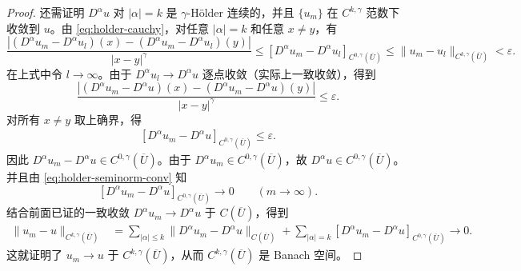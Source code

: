 \documentclass[../../main.tex]{subfiles}
\begin{document}
\begin{proof}
还需证明 \(D^\alpha u\) 对 \(|\alpha|=k\) 是 \(\gamma\)-Hölder 连续的，并且 \(\{u_m\}\) 在 \(C^{k,\gamma}\) 范数下收敛到 \(u\)。由 \eqref{eq:holder-cauchy}，对任意 \(|\alpha|=k\) 和任意 \(x\neq y\)，有
\[
\frac{|(D^\alpha u_m-D^\alpha u_l)(x)-(D^\alpha u_m-D^\alpha u_l)(y)|}{|x-y|^\gamma}
\leqslant [D^\alpha u_m-D^\alpha u_l]_{C^{0,\gamma}(\overline{U})}
\leqslant \|u_m-u_l\|_{C^{k,\gamma}(\overline{U})}<\varepsilon.
\]
在上式中令 \(l\to\infty\)。由于 \(D^\alpha u_l\to D^\alpha u\) 逐点收敛（实际上一致收敛），得到
\[
\frac{|(D^\alpha u_m-D^\alpha u)(x)-(D^\alpha u_m-D^\alpha u)(y)|}{|x-y|^\gamma}
\leqslant \varepsilon.
\]
对所有 \(x\neq y\) 取上确界，得
\begin{align}\label{eq:holder-seminorm-conv}
[D^\alpha u_m-D^\alpha u]_{C^{0,\gamma}(\overline{U})}\leqslant \varepsilon.
\end{align}
因此 \(D^\alpha u_m-D^\alpha u\in C^{0,\gamma}(\overline{U})\)。由于 \(D^\alpha u_m\in C^{0,\gamma}(\overline{U})\)，故 \(D^\alpha u\in C^{0,\gamma}(\overline{U})\)。并且由 \eqref{eq:holder-seminorm-conv} 知
\[
[D^\alpha u_m-D^\alpha u]_{C^{0,\gamma}(\overline{U})}\to 0
\qquad (m\to\infty).
\]
结合前面已证的一致收敛 \(D^\alpha u_m\to D^\alpha u\) 于 \(C(\overline{U})\)，得到
\begin{align*}
\|u_m-u\|_{C^{k,\gamma}(\overline{U})}
&=\sum_{|\alpha|\leqslant k}\|D^\alpha u_m-D^\alpha u\|_{C(\overline{U})}
+\sum_{|\alpha|=k}[D^\alpha u_m-D^\alpha u]_{C^{0,\gamma}(\overline{U})}\to 0.
\end{align*}
这就证明了 \(u_m\to u\) 于 \(C^{k,\gamma}(\overline{U})\)，从而 \(C^{k,\gamma}(\overline{U})\) 是 Banach 空间。
\end{proof}
\end{document}
